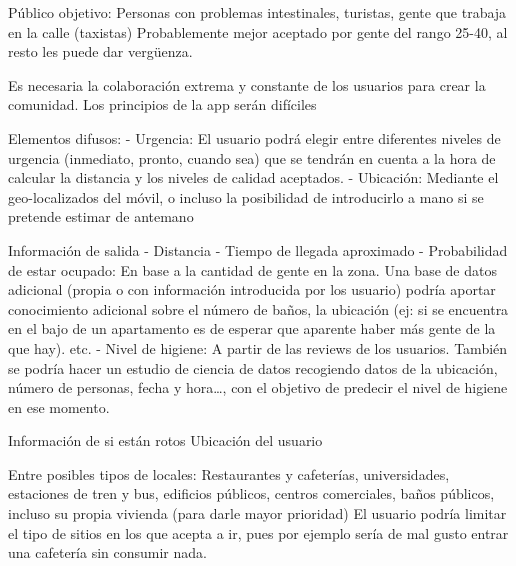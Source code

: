 \documentclass[13pt,a4paper]{article}
\begin{document}
    
    
    \tableofcontents
    \thispagestyle{empty}				%

    \newpage





Público objetivo: Personas con problemas intestinales, turistas, gente que trabaja en la calle (taxistas)
Probablemente mejor aceptado por gente del rango 25-40, al resto les puede dar vergüenza.

Es necesaria la colaboración extrema y constante de los usuarios para crear la comunidad. Los principios de la app serán difíciles

Elementos difusos:
- Urgencia: El usuario podrá elegir entre diferentes niveles de urgencia (inmediato, pronto, cuando sea) que se tendrán en cuenta a la hora de calcular la distancia y los niveles de calidad aceptados.
- Ubicación: Mediante el geo-localizados del móvil, o incluso la posibilidad de introducirlo a mano si se pretende estimar de antemano


Información de salida
- Distancia
- Tiempo de llegada aproximado
- Probabilidad de estar ocupado: En base a la cantidad de gente en la zona. Una base de datos adicional (propia o con información introducida por los usuario) podría aportar conocimiento adicional sobre el número de baños, la ubicación (ej: si se encuentra en el bajo de un apartamento es de esperar que aparente haber más gente de la que hay). etc.
- Nivel de higiene: A partir de las reviews de los usuarios. También se podría hacer un estudio de ciencia de datos recogiendo datos de la ubicación, número de personas, fecha y hora\dots, con el objetivo de predecir el nivel de higiene en ese momento.

Información de si están rotos
Ubicación del usuario

Entre posibles tipos de locales: Restaurantes y cafeterías, universidades, estaciones de tren y bus, edificios públicos, centros comerciales, baños públicos, incluso su propia vivienda (para darle mayor prioridad)
El usuario podría limitar el tipo de sitios en los que acepta a ir, pues por ejemplo sería de mal gusto entrar una cafetería sin consumir nada.


    \setlength{\parskip}{1em}
    \newpage
\end{document}
